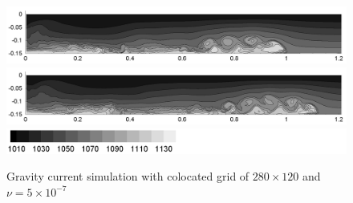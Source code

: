 \begin{figure}[htbp]
\begin{center}
\includegraphics[scale=0.55]{../figures/colocated/Fig9case/280-120-0075-V5E-7-Surf0/07.png}    \includegraphics[scale=0.55]{../figures/colocated/Fig9case/280-120-0075-V5E-7-Surf0/08.png}
\includegraphics[scale=0.55]{../figures/colocated/Fig9case/label.png}
    \caption{Gravity current simulation with colocated grid of $280 \times 120$ and $\nu=5 \times 10^{-7}$}
    \label{fig:280-120-075-V5E-7-Surf0}
  \end{center}
\end{figure}



